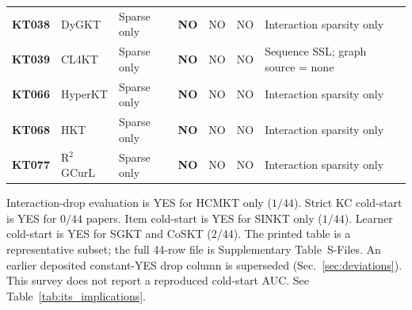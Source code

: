 \documentclass[lettersize,journal]{IEEEtran}
\begin{document}
\begin{table}[t]
\begin{tabular}{@{}ll l ccc p{3.55cm}@{}}
\textbf{KT038} & DyGKT \cite{KT038_DyGKT_2024} & Sparse only & \textbf{NO} & NO & NO & Interaction sparsity only \\
\textbf{KT039} & CL4KT \cite{KT039_CL4KT_2022} & Sparse only & \textbf{NO} & NO & NO & Sequence SSL; graph source = none \\
\textbf{KT066} & HyperKT \cite{KT066_HyperKT_2025} & Sparse only & \textbf{NO} & NO & NO & Interaction sparsity only \\
\textbf{KT068} & HKT \cite{KT068_HKT_2025} & Sparse only & \textbf{NO} & NO & NO & Interaction sparsity only \\
\textbf{KT077} & R$^2$GCurL \cite{KT077_R2GCurL_2026} & Sparse only & \textbf{NO} & NO & NO & Interaction sparsity only \\
\bottomrule
\end{tabular}
\end{table}
Interaction-drop evaluation is YES for HCMKT only ($1/44$). Strict KC cold-start is YES for $0/44$ papers. Item cold-start is YES for SINKT only ($1/44$). Learner cold-start is YES for SGKT and CoSKT ($2/44$). The printed table is a representative subset; the full 44-row file is Supplementary Table~S-Files. An earlier deposited constant-YES drop column is superseded (Sec.~\ref{sec:deviations}). This survey does not report a reproduced cold-start AUC. See Table~\ref{tab:its_implications}.
\end{document}
